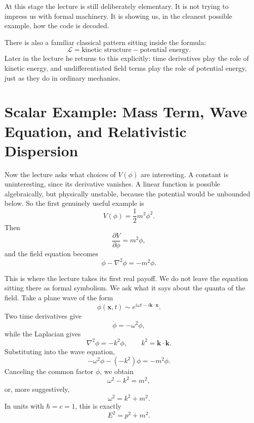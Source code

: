 At this stage the lecture is still deliberately elementary. It is not trying to impress us with formal machinery. It is showing us, in the cleanest possible example, how the code is decoded.

There is also a familiar classical pattern sitting inside the formula:
\[
\mathcal L = \text{kinetic structure} - \text{potential energy}.
\]
Later in the lecture he returns to this explicitly: time derivatives play the role of kinetic energy, and undifferentiated field terms play the role of potential energy, just as they do in ordinary mechanics.

\section{Scalar Example: Mass Term, Wave Equation, and Relativistic Dispersion}

Now the lecture asks what choices of \(V(\phi)\) are interesting. A constant is uninteresting, since its derivative vanishes. A linear function is possible algebraically, but physically unstable, because the potential would be unbounded below. So the first genuinely useful example is
\begin{equation}
V(\phi)=\frac12 m^2\phi^2.
\end{equation}
Then
\begin{equation}
\frac{\partial V}{\partial\phi}=m^2\phi,
\end{equation}
and the field equation becomes
\begin{equation}
\ddot\phi-\nabla^2\phi=-m^2\phi.
\end{equation}

This is where the lecture takes its first real payoff. We do not leave the equation sitting there as formal symbolism. We ask what it says about the quanta of the field. Take a plane wave of the form
\begin{equation}
\phi(\mathbf x,t)\sim e^{i\omega t-i\mathbf k\cdot\mathbf x}.
\end{equation}
Two time derivatives give
\[
\ddot\phi = -\omega^2\phi,
\]
while the Laplacian gives
\[
\nabla^2\phi = -k^2\phi,
\qquad
k^2=\mathbf k\cdot\mathbf k.
\]
Substituting into the wave equation,
\begin{equation}
-\omega^2\phi-(-k^2)\phi=-m^2\phi.
\end{equation}
Canceling the common factor \(\phi\), we obtain
\begin{equation}
\omega^2-k^2=m^2,
\end{equation}
or, more suggestively,
\begin{equation}
\omega^2=k^2+m^2.
\end{equation}
In units with \(\hbar=c=1\), this is exactly
\begin{equation}
E^2=p^2+m^2.
\end{equation}

